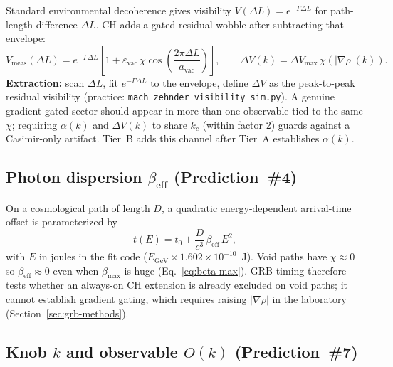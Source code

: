 \documentclass[11pt,a4paper]{article}
\begin{document}
Standard environmental decoherence gives visibility $V(\Delta L) = e^{-\Gamma\Delta L}$ for path-length difference $\Delta L$.
CH adds a gated residual wobble after subtracting that envelope:
\begin{equation}
  V_{\mathrm{meas}}(\Delta L) = e^{-\Gamma\Delta L}\left[1 + \varepsilon_{\mathrm{vac}}\,\chi\cos\!\left(\frac{2\pi\Delta L}{a_{\mathrm{vac}}}\right)\right],
  \qquad
  \Delta V(k) = \Delta V_{\max}\,\chi(|\nabla\rho|(k)).
  \label{eq:mz-vis}
\end{equation}
\textbf{Extraction:} scan $\Delta L$, fit $e^{-\Gamma\Delta L}$ to the envelope, define $\Delta V$ as the peak-to-peak residual visibility (practice: \texttt{mach\_zehnder\_visibility\_sim.py}).
A genuine gradient-gated sector should appear in more than one observable tied to the same $\chi$; requiring $\alpha(k)$ and $\Delta V(k)$ to share $k_c$ (within factor 2) guards against a Casimir-only artifact.
Tier~B adds this channel after Tier~A establishes $\alpha(k)$.

\subsection{Photon dispersion $\beta_{\mathrm{eff}}$ (Prediction~\#4)}

On a cosmological path of length $D$, a quadratic energy-dependent arrival-time offset is parameterized by
\begin{equation}
  t(E) = t_0 + \frac{D}{c^3}\,\beta_{\mathrm{eff}}\,E^2,
  \label{eq:dispersion}
\end{equation}
with $E$ in joules in the fit code ($E_{\mathrm{GeV}} \times 1.602\times 10^{-10}$~J).
Void paths have $\chi \approx 0$ so $\beta_{\mathrm{eff}} \approx 0$ even when $\beta_{\max}$ is huge (Eq.~\ref{eq:beta-max}).
GRB timing therefore tests whether an always-on CH extension is already excluded on void paths; it cannot establish gradient gating, which requires raising $|\nabla\rho|$ in the laboratory (Section~\ref{sec:grb-methods}).

\subsection{Knob $k$ and observable $O(k)$ (Prediction~\#7)}
\end{document}
